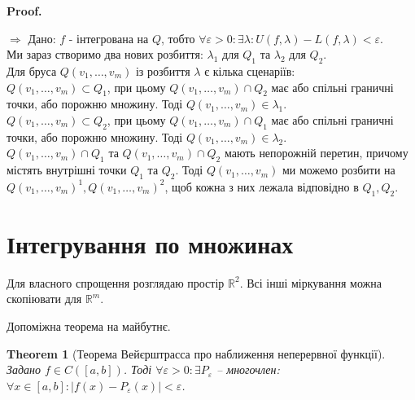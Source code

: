 \documentclass[a4paper, 10pt]{article}
\makeatletter
\def\qed{$\blacksquare$}
\def\rightproof{$\boxed{\Rightarrow}$ }
\theoremstyle{theoremdd}
\newtheorem{theorem}{Theorem}[subsection]
\theoremstyle{theoremdd}
\theoremstyle{theoremdd}
\theoremstyle{theoremdd}
\theoremstyle{theoremdd}
\theoremstyle{theoremdd}
\theoremstyle{theoremdd}
\theoremstyle{theoremdd}
\renewenvironment{proof}[1][Proof.\\]{\par
\pushQED{\hfill \qed}%
\normalfont \topsep6\p@\@plus6\p@\relax
\trivlist
\item\relax
{\bfseries
#1\@addpunct{.}}\hspace\labelsep\ignorespaces
}{%
\popQED\endtrivlist\@endpefalse
}
\makeatother
\begin{document}
\begin{proof}
\rightproof Дано: $f$ - інтегрована на $Q$, тобто $\forall \varepsilon > 0: \exists \lambda: U(f,\lambda) - L(f,\lambda) < \varepsilon$.\\
Ми зараз створимо два нових розбиття: $\lambda_1$ для $Q_1$ та $\lambda_2$ для $Q_2$.\\
Для бруса $Q(v_1,\dots,v_m)$ із розбиття $\lambda$ є кілька сценаріїв:\\
$Q(v_1,\dots,v_m) \subset Q_1$, при цьому $Q(v_1,\dots,v_m) \cap Q_2$ має або спільні граничні точки, або порожню множину. Тоді $Q(v_1,\dots,v_m) \in \lambda_1$.\\
$Q(v_1,\dots,v_m) \subset Q_2$, при цьому $Q(v_1,\dots,v_m) \cap Q_1$ має або спільні граничні точки, або порожню множину. Тоді $Q(v_1,\dots,v_m) \in \lambda_2$.\\
$Q(v_1,\dots,v_m) \cap Q_1$ та $Q(v_1,\dots,v_m) \cap Q_2$ мають непорожній перетин, причому містять внутрішні точки $Q_1$ та $Q_2$. Тоді $Q(v_1,\dots,v_m)$ ми можемо розбити на $Q(v_1,\dots,v_m)^1, Q(v_1,\dots,v_m)^2$, щоб кожна з них лежала відповідно в $Q_1,Q_2$.
\end{proof}
\fi

\newpage

\section{Інтегрування по множинах}
Для власного спрощення розглядаю простір $\mathbb{R}^2$. Всі інші міркування можна скопіювати для $\mathbb{R}^m$.

Допоміжна теорема на майбутнє.
\begin{theorem}[Теорема Вейєрштрасса про наближення неперервної функції]
Задано $f \in C([a,b])$. Тоді $\forall \varepsilon > 0: \exists P_\varepsilon$ -- многочлен: $\forall x \in [a,b]: |f(x) - P_\varepsilon(x)| < \varepsilon$.
\end{theorem}
\end{document}
